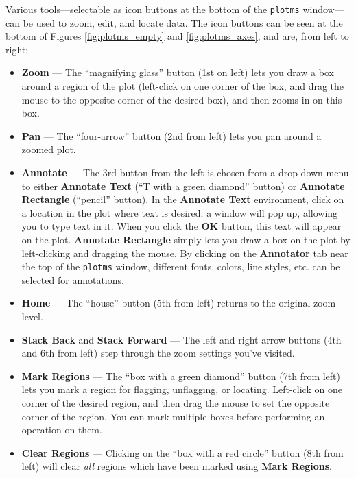 Various tools---selectable as icon buttons at the bottom of the {\tt plotms} window---can be used to zoom, edit, and locate data. The icon buttons can be seen at the bottom of Figures \ref{fig:plotms_empty} and \ref{fig:plotms_axes}, and are, from left to right:
\begin{itemize}

\item {\bf Zoom} --- The ``magnifying glass'' button (1st on left) lets you draw a box around a region of the plot (left-click on one corner of the box, and drag the mouse to the opposite corner of the desired box), and then zooms in on this box.  

\item {\bf Pan} --- The ``four-arrow'' button (2nd from left) lets you pan around a zoomed plot.

\item {\bf Annotate} --- The 3rd button from the left is chosen from a drop-down menu to either {\bf Annotate Text} (``T with a green diamond'' button) or {\bf Annotate Rectangle} (``pencil'' button). In the {\bf Annotate Text} environment, click on a location in the plot where text is desired; a window will pop up, allowing you to type text in it. When you click the {\bf OK} button, this text will appear on the plot. {\bf Annotate Rectangle} simply lets you draw a box on the plot by left-clicking and dragging the mouse. By clicking on the {\bf Annotator} tab near the top of the {\tt plotms} window, different fonts, colors, line styles, etc. can be selected for annotations. 

\item {\bf Home} --- The ``house'' button (5th from left) returns to the original zoom level.

\item {\bf Stack Back} and {\bf Stack Forward} --- The left and right arrow buttons (4th and 6th from left) step through the zoom settings you've visited.

\item {\bf Mark Regions} --- The ``box with a green diamond'' button (7th from left) lets you mark a region for flagging, unflagging, or locating. Left-click on one corner of the desired region, and then drag the mouse to set the opposite corner of the region. You can mark multiple boxes before performing an operation on them.  

\item {\bf Clear Regions} --- Clicking on the ``box with a red circle'' button (8th from left) will clear {\it all} regions which have been marked using {\bf Mark Regions}.


\end{itemize}
